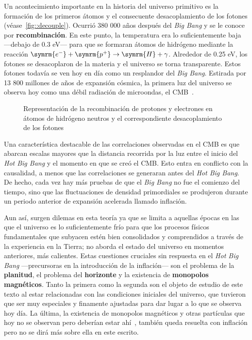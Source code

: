 Un acontecimiento importante en la historia del universo primitivo es la formación de los primeros átomos y el consecuente desacoplamiento de los fotones (véase~\autoref{fig::decouple}). Ocurrió 380 000 años después del \textit{Big Bang} y se le conoce por \textbf{recombinación}. En este punto, la temperatura era lo suficientemente baja ---debajo de 0.3 eV--- para que se formaran átomos de hidrógeno mediante la reacción \(\symrm{e^{-}}+\symrm{p^+}\rightarrow \symrm{H}+\gamma\). Alrededor de 0.25 eV, los fotones se desacoplaron de la materia y el universo se torna transparente. Estos fotones todavía se ven hoy en día como un resplandor del \textit{Big Bang}. Estirada por 13 800 millones de años de expansión cósmica, la primera luz del universo se observa hoy como una débil radiación de microondas, el CMB~\cite{penzias1965measurement}.
\begin{figure}
    \centering
    \def\svgwidth{0.9\textwidth}
    
    \caption[Representación de la recombinación de protones y electrones]{Representación de la recombinación de protones y electrones en átomos de hidrógeno neutros y el correspondiente desacoplamiento de los fotones}
    \label{fig::decouple}
\end{figure}

Una característica destacable de las correlaciones observadas en el CMB es que abarcan escalas mayores que la distancia recorrida por la luz entre el inicio del \textit{Hot Big Bang} y el momento en que se creó el CMB. Esto entra en conflicto con la causalidad, a menos que las correlaciones se generaran antes del \textit{Hot Big Bang}. De hecho, cada vez hay más pruebas de que el \textit{Big Bang} no fue el comienzo del tiempo, sino que las fluctuaciones de densidad primordiales se produjeron durante un periodo anterior de expansión acelerada llamado inflación.

Aun así, surgen dilemas en esta teoría ya que se limita a aquellas épocas en las que el universo es lo suficientemente frío para que los procesos físicos fundamentales que subyacen estén bien consolidados y comprendidos a través de la experiencia en la Tierra; no aborda el estado del universo en momentos anteriores, más calientes. Estas cuestiones cruciales sin respuesta en el \textit{Hot Big Bang} ---precursoras en la introducción de la inflación--- son el problema de la \textbf{planitud}, el problema del \textbf{horizonte} y la existencia de \textbf{monopolos magnéticos}. Tanto la primera como la segunda son el objeto de estudio de este texto al estar relacionadas con las condiciones iniciales del universo, que tuvieron que ser muy especiales y finamente ajustadas para dar lugar a lo que se observa hoy día. La última, la existencia de monopolos magnéticos y otras partículas que hoy no se observan pero deberían estar ahí~\cite{liddle1998introduction}, también queda resuelta con inflación pero no se dirá más sobre ella en este escrito.

